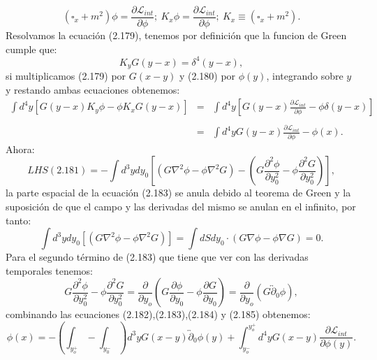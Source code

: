 \begin{equation}
(\square_{x}+m^{2})\phi=\frac{\partial\mathcal{L}_{int}}{\partial\phi};\ K_{x}\phi=\frac{\partial\mathcal{L}_{int}}{\partial\phi};\ K_{x}\equiv(\square_{x}+m^{2}).
\end{equation}
Resolvamos la ecuación (2.179), tenemos por definición que la funcion de Green cumple que:
\begin{equation}
K_yG(y-x)=\delta^4(y-x),
\end{equation}
si multiplicamos (2.179) por $G(x-y)$ y (2.180) por $\phi(y)$, integrando sobre $y$ y restando ambas ecuaciones obtenemos:
\begin{eqnarray}
\nonumber \int d^{4}y\left[G(y-x)K_{y}\phi-\phi K_{x}G(y-x)\right]&=&\int d^{4}y\left[G(y-x)\frac{\partial\mathcal{L}_{int}}{\partial\phi}-\phi\delta(y-x)\right]\\
&&\\
&=&\int d^{4}yG(y-x)\frac{\partial\mathcal{L}_{int}}{\partial\phi}-\phi(x).
\end{eqnarray}
Ahora:
\begin{equation}
LHS(2.181)=-\int d^{3}ydy_{0}\left[(G\nabla^{2}\phi-\phi\nabla^{2}G)-\left(G\frac{\partial^{2}\phi}{\partial y_{0}^{2}}-\phi\frac{\partial^{2}G}{\partial y_{0}^{2}}\right)\right] ,
\end{equation}
la parte espacial de la ecuación (2.183) se anula debido al teorema de Green y la suposición de que el campo y las derivadas del mismo se anulan en el infinito, por tanto:
\begin{equation}
\int d^{3}ydy_{0}\left[(G\nabla^{2}\phi-\phi\nabla^{2}G)\right]=\int dSdy_{0}\cdot(G\nabla\phi-\phi\nabla G)=0 .
\end{equation}
Para el segundo término de (2.183) que tiene que ver con las derivadas temporales tenemos:
\begin{equation}
G\frac{\partial^{2}\phi}{\partial y_{0}^{2}}-\phi\frac{\partial^{2}G}{\partial y_{0}^{2}}=\frac{\partial}{\partial y_{o}}\left(G\frac{\partial\phi}{\partial y_{0}}-\phi\frac{\partial G}{\partial y_{0}}\right)=\frac{\partial}{\partial y_{o}}\left(G\overleftrightarrow{\partial}_{0}\phi\right),
\end{equation}
combinando las ecuaciones (2.182),(2.183),(2.184) y (2.185) obtenemos:
\begin{equation}
\phi(x)=-\left(\int_{y_{o}^{+}}-\int_{y_{0}^{-}}\right)d^{3}yG(x-y)\overleftrightarrow{\partial}_{0}\phi(y)+\int_{y_{o}^{-}}^{y_{o}^{+}}d^{4}yG(x-y)\frac{\partial\mathcal{L}_{int}}{\partial\phi(y)} .
\end{equation}
